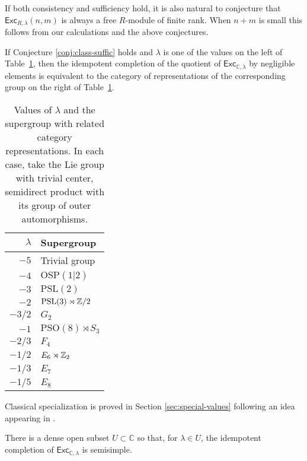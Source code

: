 \documentclass[12pt]{amsart}
\begin{document}
If both consistency and sufficiency hold, it is also natural to conjecture
that $\mathsf{Exc}_{R,\lambda}(n,m)$ is always a free $R$-module of finite
rank.  When $n+m$ is small this follows from our calculations and the above
conjectures.

\begin{proposition}
If Conjecture \ref{conj:class-suffic} holds and $\lambda$ is one of
the values on the left of Table~\ref{tab:lambda-group}, then the
idempotent completion of the quotient of
$\mathsf{Exc}_{\mathbb{C},\lambda}$ by negligible elements is equivalent
to the category of representations of the corresponding group on the
right of Table~\ref{tab:lambda-group}.
\end{proposition}

\begin{table}
  \begin{tabular}{rl}
    \toprule
    $\lambda$ & Supergroup \\ \midrule
    $-5$ & Trivial group \\
    $-4$ & $\mathrm{OSP}(1|2)$ \\
    $-3$ & $\mathrm{PSL}(2)$ \\
    $-2$ & $\mathrm{PSL}(3) \rtimes \mathbb Z/2$ \\
    $-3/2$ & $G_2$ \\
    $-1$ & $\mathrm{PSO}(8) \rtimes S_3$ \\
    $-2/3$ & $F_4$ \\
    $-1/2$ & $E_6 \rtimes \mathbb Z_2$ \\
    $-1/3$ & $E_7$ \\
    $-1/5$ & $E_8$ \\
    \bottomrule
  \end{tabular}
  \caption{Values of $\lambda$ and the supergroup with related category
    representations. In each case, take the Lie group
    with trivial center, semidirect product with its group of outer
    automorphisms.}
  \label{tab:lambda-group}
\end{table}

Classical specialization is proved in Section \ref{sec:special-values} following
an idea appearing in \cite{1709.01278}.


\begin{conjecture}
There is a dense open subset $U \subset \mathbb{C}$ so that, for
$\lambda \in U$, the idempotent
completion of $\mathsf{Exc}_{\mathbb{C},\lambda}$ is
semisimple.
\end{conjecture}
\end{document}
